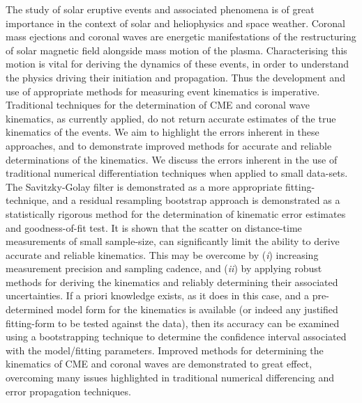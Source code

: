 \documentclass[structabstract]{aa}
\begin{document}
\date{Received ?; accepted ?}
\abstract
{The study of solar eruptive events and associated phenomena is of great importance in the context of solar and heliophysics and space weather. Coronal mass ejections and coronal waves are energetic manifestations of the restructuring of solar magnetic field alongside mass motion of the plasma. Characterising this motion is vital for deriving the dynamics of these events, in order to understand the physics driving their initiation and propagation. Thus the development and use of appropriate methods for measuring event kinematics is imperative.} 
{Traditional techniques for the determination of CME and coronal wave kinematics, as currently applied, do not return accurate estimates of the true kinematics of the events. We aim to highlight the errors inherent in these approaches, and to demonstrate improved methods for accurate and reliable determinations of the kinematics.}
{We discuss the errors inherent in the use of traditional numerical differentiation techniques when applied to small data-sets. The Savitzky-Golay filter is demonstrated as a more appropriate fitting-technique, and a residual resampling bootstrap approach is demonstrated as a statistically rigorous method for the determination of kinematic error estimates and goodness-of-fit test.}
{It is shown that the scatter on distance-time measurements of small sample-size, can significantly limit the ability to derive accurate and reliable kinematics. This may be overcome by (\emph{i}) increasing measurement precision and sampling cadence, and (\emph{ii}) by applying robust methods for deriving the kinematics and reliably determining their associated uncertainties. If a priori knowledge exists, as it does in this case, and a pre-determined model form for the kinematics is available (or indeed any justified fitting-form to be tested against the data), then its accuracy can be examined using a bootstrapping technique to determine the confidence interval associated with the model/fitting parameters.}
{Improved methods for determining the kinematics of CME and coronal waves are demonstrated to great effect, overcoming many issues highlighted in traditional numerical differencing and error propagation techniques.}


\end{document}
